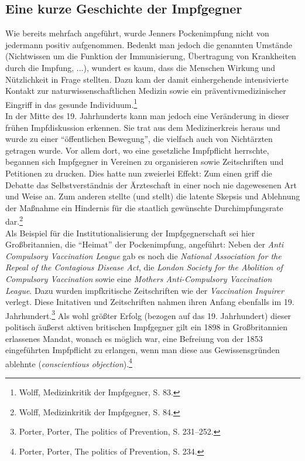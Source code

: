 \documentclass[
    a4paper,
    12pt,
    hyphens,
    chapterprefix=true,
    headheight=33pt,
    footheight=29pt,
    headings=optiontohead,
]{scrartcl}
\begin{document}
\subsection{Eine kurze Geschichte der Impfgegner}
Wie bereits mehrfach angeführt, wurde Jenners Pockenimpfung nicht von jedermann positiv aufgenommen. Bedenkt man jedoch die genannten Umstände (Nichtwissen um die Funktion der Immunisierung, Übertragung von Krankheiten durch die Impfung, ...), wundert es kaum, dass die Menschen Wirkung und Nützlichkeit in Frage stellten. Dazu kam der damit einhergehende intensivierte Kontakt zur naturwissenschaftlichen Medizin sowie ein präventivmedizinischer Eingriff in das gesunde Individuum.\footnote{Wolff, Medizinkritik der Impfgegner, S. 83.}\\

In der Mitte des 19. Jahrhunderts kann man jedoch eine Veränderung in dieser frühen Impfdiskussion erkennen. Sie trat aus dem Medizinerkreis heraus und wurde zu einer "`öffentlichen Bewegung"', die vielfach auch von Nichtärzten getragen wurde. Vor allem dort, wo eine gesetzliche Impfpflicht herrschte, begannen sich Impfgegner in Vereinen zu organisieren sowie Zeitschriften und Petitionen zu drucken. Dies hatte nun zweierlei Effekt: Zum einen griff die Debatte das Selbstverständnis der Ärzteschaft in einer noch nie dagewesenen Art und Weise an. Zum anderen stellte (und stellt) die latente Skepsis und Ablehnung der Maßnahme ein Hindernis für die staatlich gewünschte Durchimpfungsrate dar.\footnote{Wolff, Medizinkritik der Impfgegner, S. 84.}\\
Als Beispiel für die Institutionalisierung der Impfgegnerschaft sei hier Großbritannien, die "`Heimat"' der Pockenimpfung, angeführt: Neben der \textit{Anti Compulsory Vaccination League} gab es noch die \textit{National Association for the Repeal of the Contagious Disease Act}, die \textit{London Society for the Abolition of Compulsory Vaccination} sowie eine \textit{Mothers Anti-Compulsory Vaccination League}. Dazu wurden impfkritische Zeitschriften wie der \textit{Vaccination Inquirer} verlegt. Diese Initativen und Zeitschriften nahmen ihren Anfang ebenfalls im 19. Jahrhundert.\footnote{Porter, Porter, The politics of Prevention, S. 231--252.} Als wohl größter Erfolg (bezogen auf das 19. Jahrhundert) dieser politisch äußerst aktiven britischen Impfgegner gilt ein 1898 in Großbritannien erlassenes Mandat, wonach es möglich war, eine Befreiung von der 1853 eingeführten Impfpflicht zu erlangen, wenn man diese aus Gewissensgründen ablehnte (\textit{conscientious objection}).\footnote{Porter, Porter, The politics of Prevention, S. 234.}\\
\end{document}
